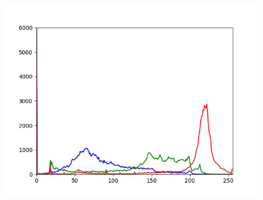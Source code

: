 \documentclass[a4paper,12pt,oneside]{article}
\begin{document}
\begin{figure}[htb]
\begin{minipage}[c]{0.08\textwidth}
\end{minipage}
\hfill
\begin{minipage}[c]{0.3\textwidth}
\includegraphics[width=\textwidth]{Sources/Bild2_GW_histo.png}
\end{minipage}
\end{figure}
\end{document}
